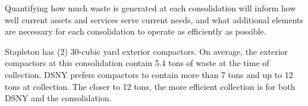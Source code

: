 
    Quantifying how much waste is generated at each consolidation will inform how well current assets and services serve current needs, and what additional elements are necessary for each consolidation to operate as efficiently as possible.
    
    Stapleton has (2) 30-cubic yard exterior compactors. On average, the exterior compactors at this consolidation contain 5.4 tons of waste at the time of collection. DSNY prefers compactors to contain more than 7 tons and up to 12 tons at collection. The closer to 12 tons, the more efficient collection is for both DSNY and the consolidation.